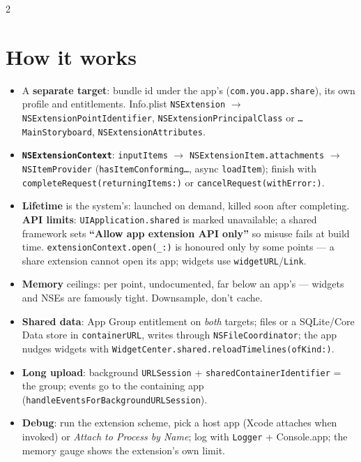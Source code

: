 \documentclass[8pt]{extarticle}
\begin{document}
\begin{multicols}{2}
\section{How it works}
\begin{itemize}
  \item A \textbf{separate target}: bundle id under the app's
        (\texttt{com.you.app.share}), its own profile and entitlements. Info.plist
        \texttt{NSExtension} $\to$ \texttt{NSExtensionPointIdentifier},
        \texttt{NSExtensionPrincipalClass} or \texttt{\dots MainStoryboard},
        \texttt{NSExtensionAttributes}.
  \item \textbf{\texttt{NSExtensionContext}}: \texttt{inputItems} $\to$
        \texttt{NSExtensionItem.\allowbreak attachments} $\to$ \texttt{NSItemProvider}
        (\texttt{hasItemConforming\dots}, async \texttt{loadItem}); finish with
        \texttt{completeRequest(\allowbreak returningItems:)} or
        \texttt{cancelRequest(withError:)}.
  \item \textbf{Lifetime} is the system's: launched on demand, killed soon after
        completing. \textbf{API limits}: \texttt{UIApplication.shared} is marked
        unavailable; a shared framework sets \textbf{``Allow app extension API
        only''} so misuse fails at build time. \texttt{extensionContext.open(\_:)}
        is honoured only by some points — a share extension cannot open its app;
        widgets use \texttt{widgetURL}/\texttt{Link}.
  \item \textbf{Memory} ceilings: per point, undocumented, far below an app's —
        widgets and NSEs are famously tight. Downsample, don't cache.
  \item \textbf{Shared data}: App Group entitlement on \emph{both} targets; files or
        a SQLite/Core Data store in \texttt{containerURL}, writes through
        \texttt{NSFileCoordinator}; the app nudges widgets with
        \texttt{WidgetCenter.shared.\allowbreak reloadTimelines(ofKind:)}.
  \item \textbf{Long upload}: background \texttt{URLSession} +
        \texttt{sharedContainer\allowbreak Identifier} = the group; events go to the
        containing app (\texttt{handleEventsFor\allowbreak BackgroundURLSession}).
  \item \textbf{Debug}: run the extension scheme, pick a host app (Xcode attaches
        when invoked) or \emph{Attach to Process by Name}; log with \texttt{Logger}
        + Console.app; the memory gauge shows the extension's own limit.
\end{itemize}


\end{multicols}
\end{document}
